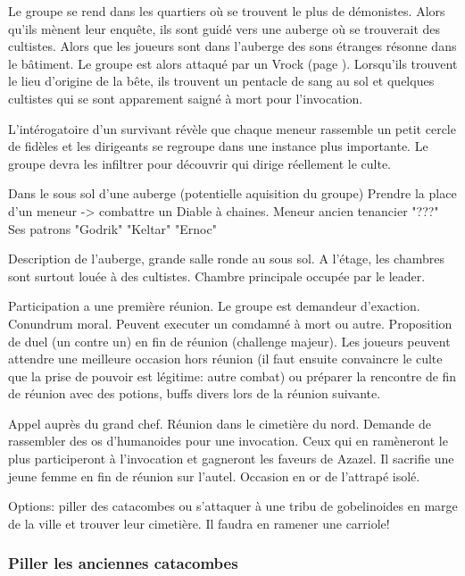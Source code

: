 Le groupe se rend dans les quartiers où se trouvent le plus de démonistes. 
Alors qu'ils mènent leur enquête, ils sont guidé vers une auberge où se 
trouverait des cultistes. Alors que les joueurs sont dans l'auberge des sons 
étranges résonne dans le bâtiment. Le groupe est alors attaqué par un Vrock
(page \pageref{Vrock}). Lorsqu'ils trouvent le lieu d'origine de la bête, ils trouvent un 
pentacle de sang au sol et quelques cultistes qui se sont apparement saigné 
à mort pour l'invocation.

L'intérogatoire d'un survivant révèle que chaque meneur rassemble un petit 
cercle de fidèles et les dirigeants se regroupe dans une instance plus 
importante. Le groupe devra les infiltrer pour découvrir qui dirige réellement
le culte.

Dans le sous sol d'une auberge (potentielle aquisition du groupe)
Prendre la place d'un meneur -> combattre un Diable à chaines.
Meneur ancien tenancier "???"
Ses patrons "Godrik" "Keltar" "Ernoc"

Description de l'auberge, grande salle ronde au sous sol. A l'étage, les 
chambres sont surtout louée à des cultistes. Chambre principale occupée par le leader.

Participation a une première réunion.
Le groupe est demandeur d'exaction. Conundrum moral. Peuvent executer un comdamné à mort ou autre.
Proposition de duel (un contre un) en fin de réunion (challenge majeur). Les joueurs peuvent attendre une meilleure
occasion hors réunion (il faut ensuite convaincre le culte que la prise de 
pouvoir est légitime: autre combat) ou préparer la rencontre de fin de réunion avec des potions, buffs divers lors de la réunion suivante.


Appel auprès du grand chef. Réunion dans le cimetière du nord. Demande de rassembler des os d'humanoides 
pour une invocation. Ceux qui en ramèneront le plus participeront à l'invocation et gagneront les faveurs de Azazel.
Il sacrifie une jeune femme en fin de réunion sur l'autel.  Occasion en or de l'attrapé isolé.

Options: piller des catacombes ou s'attaquer à une tribu de gobelinoides en marge de la ville et trouver leur cimetière. Il faudra en ramener une carriole!

\subsubsection*{Piller les anciennes catacombes}

